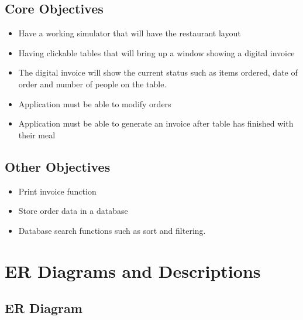 \subsection{Core Objectives}

\begin{itemize}
	\item Have a working simulator that will have the restaurant layout
	\item Having clickable tables that will bring up a window showing a digital invoice
	\item The digital invoice will show the current status such as items ordered, date of order and number of people on the table.
	\item Application must be able to modify orders
	\item Application must be able to generate an invoice after table has finished with their meal
\end{itemize} 

\subsection{Other Objectives}


\begin{itemize}
	\item Print invoice function
	\item Store order data in a database
	\item Database search functions such as sort and filtering.
\end{itemize} 

\section{ER Diagrams and Descriptions}

\subsection{ER Diagram}

